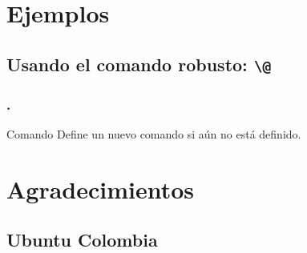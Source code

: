 \documentclass[12pt]{beamer}
\begin{document}
\section{Ejemplos}
\cprotect\subsection{Usando el comando robusto: \verb!\@!}

\begin{frame}
\frametitle{\thesection.}
\begin{alertblock}{Comando }
Define un nuevo comando si aún no está definido.
\end{alertblock}
\end{frame}
\section{Agradecimientos}
\subsection{Ubuntu Colombia}
 
\end{document}
